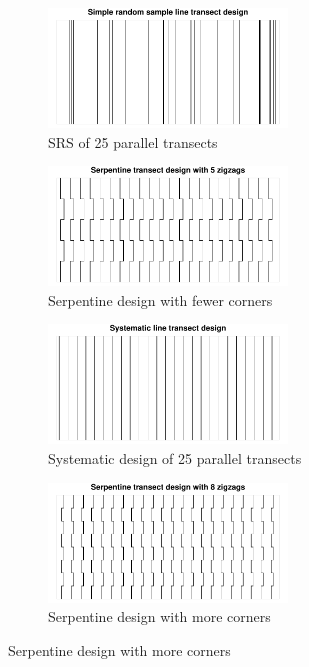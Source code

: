 \documentclass[review]{elsarticle}
\begin{document}
\begin{figure}

\begin{subfigure}{2.5in}
\includegraphics[width=2.5in]{../graphics/SRS000176.pdf}
\caption{SRS of 25 parallel transects}
\label{srs000176}
\end{subfigure}
\begin{subfigure}{2.5in}
\includegraphics[width=2.5in]{../graphics/Serp000124.pdf}
\caption{Serpentine design with fewer corners}
\label{serp000124}
\end{subfigure}

\begin{subfigure}{2.5in}
\includegraphics[width=2.5in]{../graphics/Sys000141.pdf}
\caption{Systematic design of 25 parallel transects}
\label{sys000141}
\end{subfigure}
\begin{subfigure}{2.5in}
\includegraphics[width=2.5in]{../graphics/Serp000539.pdf}
\caption{Serpentine design with more corners}
\label{serp000539}
\end{subfigure}


\end{figure}
\end{document}
